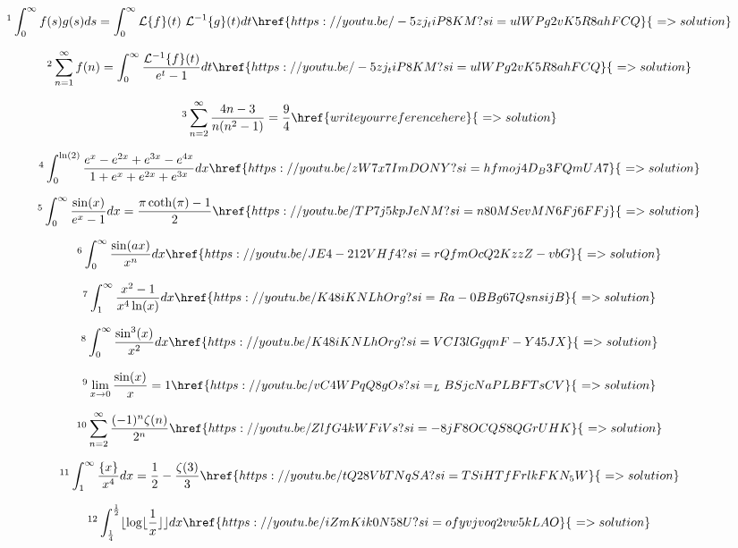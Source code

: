 \documentclass[12pt]{article}
\begin{document}
\[ \footnote{ Two amazing theorems of MAZ -I} \int_0^{\infty} f(s)g(s) ds = \int_0^{\infty} \mathcal{L} \{ f \}(t)\,\, \mathcal{L}^{-1} \{g\} (t) dt  \href{https://youtu.be/-5zj_tiP8KM?si=ulWPg2vK5R8ahFCQ}{\,\,=>solution}  \]

\[ \footnote{ Two amazing theorems of MAZ -II} \sum_{n=1}^{\infty} f(n) = \int_0^{\infty} \frac{\mathcal{L}^{-1} \{ f\}(t)  }{e^t-1} dt  \href{https://youtu.be/-5zj_tiP8KM?si=ulWPg2vK5R8ahFCQ}{\,\,=>solution}  \]

\[ \footnote{ MAZ theorem helps me solve this infinite sum} \sum_{n=2}^{\infty} \frac{4n-3}{n(n^2-1)}  = \frac{9}{4}   \href{write your reference here}{\,\,=>solution}   \]

\[ \footnote{ Monstrous JEE Advanced Integral} \int_0^{\ln(2)} \frac{e^x - e^{2x} + e^{3x}-e^{4x}}{1+e^x + e^{2x} + e^{3x}} dx  \href{https://youtu.be/zW7x7ImDONY?si=hfmoj4D_B3FQmUA7}{\,\,=>solution}   \]

\[ \footnote{ MAZ theorem helps me solve this integral} \int_0^{\infty} \frac{\sin(x)}{e^x-1} dx = \frac{\pi \coth(\pi)-1}{2}    \href{https://youtu.be/TP7j5kpJeNM?si=n80MSevMN6Fj6FFj}{\,\,=>solution}   \]

\[ \footnote{ Smashing an improper integral using MAZ Identity} \int_0^{\infty} \frac{\sin(ax)}{x^n} dx  \href{https://youtu.be/JE4-212VHf4?si=rQfmOcQ2KzzZ-vbG}{\,\,=>solution}   \]

\[ \footnote{ MAZ Identity speed rockets the integral} \int_1^{\infty} \frac{x^2-1}{x^4 \ln(x)} dx \href{https://youtu.be/K48iKNLhOrg?si=Ra-0BBg67QsnsijB}{\,\,=>solution}   \]

\[ \footnote{ MAZ Identity speed rockets the integral} \int_0^{\infty} \frac{\sin^3(x)}{x^2} dx  \href{https://youtu.be/K48iKNLhOrg?si=VCI3lGgqnF-Y45JX}{\,\,=>solution}   \]

\[ \footnote{ 5 Unusual ways to prove this limit} \lim_{x\to0} \frac{\sin(x)}{x}=1 \href{https://youtu.be/vC4WPqQ8gOs?si=_LBSjcNaPLBFTsCV}{\,\,=>solution}   \]

\[ \footnote{ DIGamma Function helps me solve this infinite sum} \sum_{n=2}^{\infty} \frac{(-1)^n \zeta(n)}{2^n}  \href{https://youtu.be/ZlfG4kWFiVs?si=-8jF8OCQS8QGrUHK}{\,\,=>solution}   \]

\[ \footnote{ Integration of Fraction Part for IIT JEE} \int_1^{\infty} \frac{\{x\}}{x^4} dx = \frac{1}{2}-\frac{\zeta(3)}{3} \href{https://youtu.be/tQ28VbTNqSA?si=TSiHTfFrlkFKN_5W}{\,\,=>solution}    \]

\[ \footnote{ A tricky GIF Integral from MIT Integration Bee} \int_{\frac{1}{4}}^{\frac{1}{2}} \lfloor \log \lfloor \frac{1}{x}\rfloor \rfloor dx \href{https://youtu.be/iZmKik0N58U?si=ofyvjvoq2vw5kLAO}{\,\,=>solution}   \]
\end{document}
